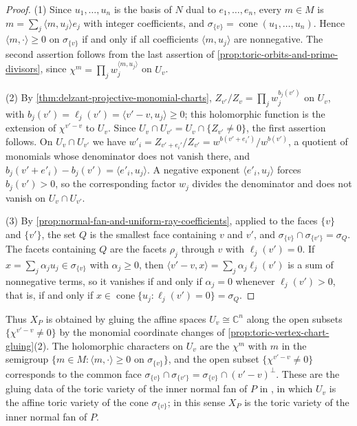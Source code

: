 \begin{proof}
(1) Since $u_1,\ldots,u_n$ is the basis of $N$ dual to $e_1,\ldots,e_n$, every $m\in M$ is $m=\sum_j\langle m,u_j\rangle e_j$ with integer coefficients, and $\sigma_{\{v\}}=\operatorname{cone}(u_1,\ldots,u_n)$. Hence $\langle m,\cdot\rangle\geq0$ on $\sigma_{\{v\}}$ if and only if all coefficients $\langle m,u_j\rangle$ are nonnegative. The second assertion follows from the last assertion of \cref{prop:toric-orbits-and-prime-divisors}, since $\chi^m=\prod_jw_j^{\langle m,u_j\rangle}$ on $U_v$.

(2) By \cref{thm:delzant-projective-monomial-charts}, $Z_{v'}/Z_v=\prod_jw_j^{b_j(v')}$ on $U_v$, with $b_j(v')=\ell_j(v')=\langle v'-v,u_j\rangle\geq0$; this holomorphic function is the extension of $\chi^{v'-v}$ to $U_v$. Since $U_v\cap U_{v'}=U_v\cap\{Z_{v'}\neq0\}$, the first assertion follows. On $U_v\cap U_{v'}$ we have $w'_i=Z_{v'+e_i'}/Z_{v'}=w^{b(v'+e_i')}/w^{b(v')}$, a quotient of monomials whose denominator does not vanish there, and $b_j(v'+e'_i)-b_j(v')=\langle e'_i,u_j\rangle$. A negative exponent $\langle e'_i,u_j\rangle$ forces $b_j(v')>0$, so the corresponding factor $w_j$ divides the denominator and does not vanish on $U_v\cap U_{v'}$.

(3) By \cref{prop:normal-fan-and-uniform-ray-coefficients}, applied to the faces $\{v\}$ and $\{v'\}$, the set $Q$ is the smallest face containing $v$ and $v'$, and $\sigma_{\{v\}}\cap\sigma_{\{v'\}}=\sigma_Q$. The facets containing $Q$ are the facets $\rho_j$ through $v$ with $\ell_j(v')=0$. If $x=\sum_j\alpha_ju_j\in\sigma_{\{v\}}$ with $\alpha_j\geq0$, then $\langle v'-v,x\rangle=\sum_j\alpha_j\ell_j(v')$ is a sum of nonnegative terms, so it vanishes if and only if $\alpha_j=0$ whenever $\ell_j(v')>0$, that is, if and only if $x\in\operatorname{cone}\{u_j:\ell_j(v')=0\}=\sigma_Q$.
\end{proof}

Thus $X_P$ is obtained by gluing the affine spaces $U_v\cong\mathbb C^n$ along the open subsets $\{\chi^{v'-v}\neq0\}$ by the monomial coordinate changes of \cref{prop:toric-vertex-chart-gluing}(2). The holomorphic characters on $U_v$ are the $\chi^m$ with $m$ in the semigroup $\{m\in M:\langle m,\cdot\rangle\geq0\text{ on }\sigma_{\{v\}}\}$, and the open subset $\{\chi^{v'-v}\neq0\}$ corresponds to the common face $\sigma_{\{v\}}\cap\sigma_{\{v'\}}=\sigma_{\{v\}}\cap(v'-v)^\perp$. These are the gluing data of the toric variety of the inner normal fan of $P$ in \cite[Section~3.1]{CLS11}, in which $U_v$ is the affine toric variety of the cone $\sigma_{\{v\}}$; in this sense $X_P$ is the toric variety of the inner normal fan of $P$.

